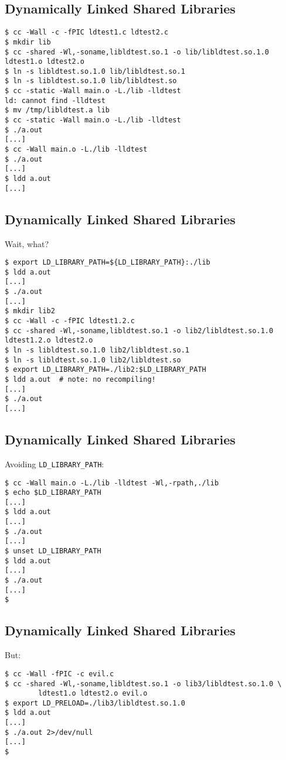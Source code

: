 \documentclass[xga]{xdvislides}
\begin{document}
\subsection{Dynamically Linked Shared Libraries}
\begin{verbatim}
$ cc -Wall -c -fPIC ldtest1.c ldtest2.c
$ mkdir lib
$ cc -shared -Wl,-soname,libldtest.so.1 -o lib/libldtest.so.1.0 ldtest1.o ldtest2.o
$ ln -s libldtest.so.1.0 lib/libldtest.so.1
$ ln -s libldtest.so.1.0 lib/libldtest.so
$ cc -static -Wall main.o -L./lib -lldtest
ld: cannot find -lldtest
$ mv /tmp/libldtest.a lib
$ cc -static -Wall main.o -L./lib -lldtest
$ ./a.out
[...]
$ cc -Wall main.o -L./lib -lldtest
$ ./a.out
[...]
$ ldd a.out
[...]
\end{verbatim}

\subsection{Dynamically Linked Shared Libraries}
Wait, what?
\begin{verbatim}
$ export LD_LIBRARY_PATH=${LD_LIBRARY_PATH}:./lib
$ ldd a.out
[...]
$ ./a.out
[...]
$ mkdir lib2
$ cc -Wall -c -fPIC ldtest1.2.c
$ cc -shared -Wl,-soname,libldtest.so.1 -o lib2/libldtest.so.1.0 ldtest1.2.o ldtest2.o
$ ln -s libldtest.so.1.0 lib2/libldtest.so.1
$ ln -s libldtest.so.1.0 lib2/libldtest.so
$ export LD_LIBRARY_PATH=./lib2:$LD_LIBRARY_PATH
$ ldd a.out  # note: no recompiling!
[...]
$ ./a.out
[...]
\end{verbatim}

\subsection{Dynamically Linked Shared Libraries}
Avoiding {\tt LD\_LIBRARY\_PATH}:
\begin{verbatim}
$ cc -Wall main.o -L./lib -lldtest -Wl,-rpath,./lib
$ echo $LD_LIBRARY_PATH
[...]
$ ldd a.out
[...]
$ ./a.out
[...]
$ unset LD_LIBRARY_PATH
$ ldd a.out
[...]
$ ./a.out
[...]
$
\end{verbatim}

\subsection{Dynamically Linked Shared Libraries}
But:
\begin{verbatim}
$ cc -Wall -fPIC -c evil.c
$ cc -shared -Wl,-soname,libldtest.so.1 -o lib3/libldtest.so.1.0 \
        ldtest1.o ldtest2.o evil.o
$ export LD_PRELOAD=./lib3/libldtest.so.1.0
$ ldd a.out
[...]
$ ./a.out 2>/dev/null
[...]
$
\end{verbatim}
\end{document}
